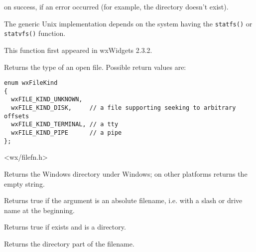 
\true on success, \false if an error occurred (for example, the
directory doesn't exist).


The generic Unix implementation depends on the system having
the \texttt{statfs()} or \texttt{statvfs()} function.

This function first appeared in wxWidgets 2.3.2.


\label{wxgetfilekind}



Returns the type of an open file. Possible return values are:

\begin{verbatim}
enum wxFileKind
{
  wxFILE_KIND_UNKNOWN,
  wxFILE_KIND_DISK,     // a file supporting seeking to arbitrary offsets
  wxFILE_KIND_TERMINAL, // a tty
  wxFILE_KIND_PIPE      // a pipe
};

\end{verbatim}


<wx/filefn.h>


\label{wxgetosdirectory}


Returns the Windows directory under Windows; on other platforms returns the empty string.


\label{wxisabsolutepath}


Returns true if the argument is an absolute filename, i.e. with a slash
or drive name at the beginning.


\label{functionwxdirexists}


Returns true if  exists and is a directory.


\label{wxpathonly}


Returns the directory part of the filename.


